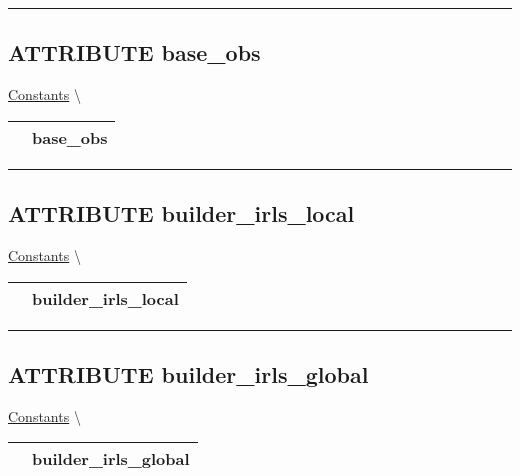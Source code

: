 \par


\rule{\linewidth}{0.5pt}
\subsection*{\textsf{\colorbox{headtoc}{\color{white} ATTRIBUTE}
base\_obs}}

\hypertarget{ecldoc:constants.base_obs}{}
\hspace{0pt} \hyperlink{ecldoc:Constants}{Constants} \textbackslash 

{\renewcommand{\arraystretch}{1.5}
\begin{tabularx}{\textwidth}{|>{\raggedright\arraybackslash}l|X|}
\hline
\hspace{0pt}\mytexttt{\color{red} } & \textbf{base\_obs} \\
\hline
\end{tabularx}
}

\par


\rule{\linewidth}{0.5pt}
\subsection*{\textsf{\colorbox{headtoc}{\color{white} ATTRIBUTE}
builder\_irls\_local}}

\hypertarget{ecldoc:constants.builder_irls_local}{}
\hspace{0pt} \hyperlink{ecldoc:Constants}{Constants} \textbackslash 

{\renewcommand{\arraystretch}{1.5}
\begin{tabularx}{\textwidth}{|>{\raggedright\arraybackslash}l|X|}
\hline
\hspace{0pt}\mytexttt{\color{red} } & \textbf{builder\_irls\_local} \\
\hline
\end{tabularx}
}

\par


\rule{\linewidth}{0.5pt}
\subsection*{\textsf{\colorbox{headtoc}{\color{white} ATTRIBUTE}
builder\_irls\_global}}

\hypertarget{ecldoc:constants.builder_irls_global}{}
\hspace{0pt} \hyperlink{ecldoc:Constants}{Constants} \textbackslash 

{\renewcommand{\arraystretch}{1.5}
\begin{tabularx}{\textwidth}{|>{\raggedright\arraybackslash}l|X|}
\hline
\hspace{0pt}\mytexttt{\color{red} } & \textbf{builder\_irls\_global} \\
\hline
\end{tabularx}
}

